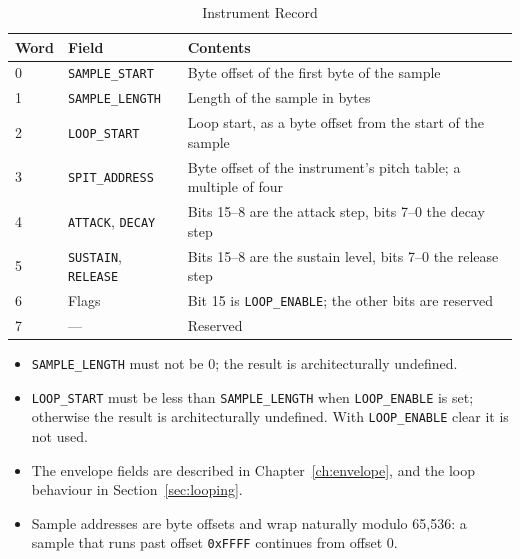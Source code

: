 \begin{table}[H]
	\centering
	\begin{tabular}{llp{8cm}}
		\toprule
		\textbf{Word} & \textbf{Field}                     & \textbf{Contents}                                               \\
		\midrule
		0             & \texttt{SAMPLE\_START}             & Byte offset of the first byte of the sample                     \\
		1             & \texttt{SAMPLE\_LENGTH}            & Length of the sample in bytes                                   \\
		2             & \texttt{LOOP\_START}               & Loop start, as a byte offset from the start of the sample       \\
		3             & \texttt{SPIT\_ADDRESS}             & Byte offset of the instrument's pitch table; a multiple of four \\
		4             & \texttt{ATTACK}, \texttt{DECAY}    & Bits 15--8 are the attack step, bits 7--0 the decay step        \\
		5             & \texttt{SUSTAIN}, \texttt{RELEASE} & Bits 15--8 are the sustain level, bits 7--0 the release step    \\
		6             & Flags                              & Bit 15 is \texttt{LOOP\_ENABLE}; the other bits are reserved    \\
		7             & ---                                & Reserved                                                        \\
		\bottomrule
	\end{tabular}
	\caption{Instrument Record}
	\label{tab:instrument}
\end{table}

\begin{itemize}
	\item \texttt{SAMPLE\_LENGTH} must not be 0; the result is architecturally undefined.
	\item \texttt{LOOP\_START} must be less than \texttt{SAMPLE\_LENGTH} when \texttt{LOOP\_ENABLE} is set; otherwise the
	      result is architecturally undefined. With \texttt{LOOP\_ENABLE} clear it is not used.
	\item The envelope fields are described in Chapter~\ref{ch:envelope}, and the loop behaviour in Section~\ref{sec:looping}.
	\item Sample addresses are byte offsets and wrap naturally modulo 65,536: a sample that runs past offset \texttt{0xFFFF}
	      continues from offset 0.
\end{itemize}

